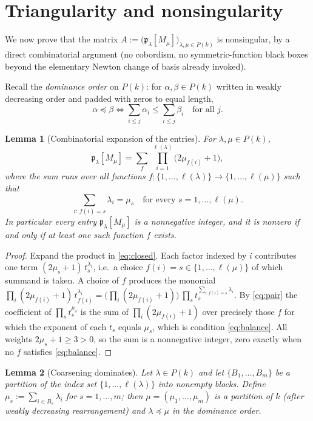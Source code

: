 \documentclass[12pt]{article}
\newtheorem{lemma}{Lemma}
\theoremstyle{definition}
\begin{document}
\bigskip

\section{Triangularity and nonsingularity}

We now prove that the matrix
$A:=\big(\mathfrak{p}_\lambda[M_\mu]\big)_{\lambda,\mu\in P(k)}$ is nonsingular, by a
direct combinatorial argument (no cobordism, no symmetric-function black boxes beyond the
elementary Newton change of basis already invoked).

Recall the \emph{dominance order} on $P(k)$: for $\alpha,\beta\in P(k)$ written in
weakly decreasing order and padded with zeros to equal length,
\[
\alpha\preceq\beta\iff
\sum_{i\le j}\alpha_i\le\sum_{i\le j}\beta_i\quad\text{for all }j.
\]

\begin{lemma}[Combinatorial expansion of the entries]\label{lem:expand}
For $\lambda,\mu\in P(k)$,
\[
\mathfrak{p}_\lambda[M_\mu]
=\sum_{f}\ \prod_{i=1}^{\ell(\lambda)}\big(2\mu_{f(i)}+1\big),
\tag{8}\label{eq:expand}
\]
where the sum runs over all functions $f:\{1,\dots,\ell(\lambda)\}\to\{1,\dots,\ell(\mu)\}$
such that
\[
\sum_{i:\,f(i)=s}\lambda_i=\mu_s\quad\text{for every }s=1,\dots,\ell(\mu).
\tag{9}\label{eq:balance}
\]
In particular every entry $\mathfrak{p}_\lambda[M_\mu]$ is a nonnegative integer, and it
is nonzero if and only if at least one such function $f$ exists.
\end{lemma}

\begin{proof}
Expand the product in \eqref{eq:closed}.  Each factor indexed by $i$ contributes one term
$(2\mu_{s}+1)\,t_{s}^{\lambda_i}$, i.e.\ a choice $f(i)=s\in\{1,\dots,\ell(\mu)\}$ of which
summand is taken.  A choice of $f$ produces the monomial
$\prod_{i}(2\mu_{f(i)}+1)\,t_{f(i)}^{\lambda_i}
=\big(\prod_i(2\mu_{f(i)}+1)\big)\,\prod_{s}t_s^{\sum_{i:f(i)=s}\lambda_i}$.
By \eqref{eq:pair} the coefficient of $\prod_s t_s^{\mu_s}$ is the sum of
$\prod_i(2\mu_{f(i)}+1)$ over precisely those $f$ for which the exponent of each $t_s$
equals $\mu_s$, which is condition \eqref{eq:balance}.  All weights
$2\mu_s+1\ge 3>0$, so the sum is a nonnegative integer, zero exactly when no $f$ satisfies
\eqref{eq:balance}.
\end{proof}

\begin{lemma}[Coarsening dominates]\label{lem:merge}
Let $\lambda\in P(k)$ and let $\{B_1,\dots,B_m\}$ be a partition of the index set
$\{1,\dots,\ell(\lambda)\}$ into nonempty blocks.  Define $\mu_s:=\sum_{i\in B_s}\lambda_i$
for $s=1,\dots,m$; then $\mu=(\mu_1,\dots,\mu_m)$ is a partition of $k$ (after weakly
decreasing rearrangement) and $\lambda\preceq\mu$ in the dominance order.
\end{lemma}
\end{document}
